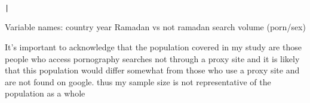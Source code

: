 \documentclass[]{article}
\begin{document}
\textbar{} \textbar{}

\begin{verbatim}
                                                                                                                                                                                                                              |
\end{verbatim}

Variable names: country year Ramadan vs not ramadan search volume
(porn/sex)

It's important to acknowledge that the population covered in my study
are those people who access pornography searches not through a proxy
site and it is likely that this population would differ somewhat from
those who use a proxy site and are not found on google. thus my sample
size is not representative of the population as a whole
\end{document}
